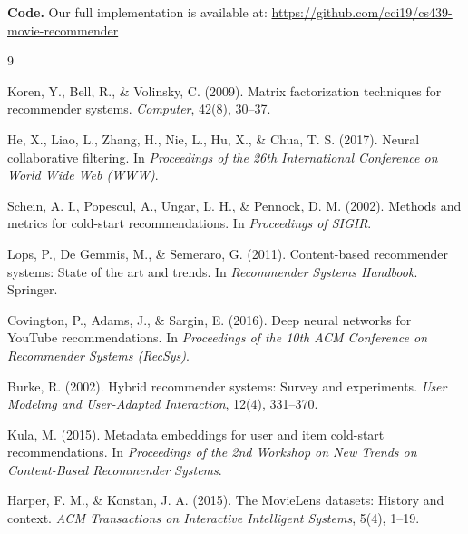 \documentclass{article}
\begin{document}
\textbf{Code.} Our full implementation is available at: \url{https://github.com/cci19/cs439-movie-recommender}


\begin{thebibliography}{9}

Koren, Y., Bell, R., \& Volinsky, C. (2009). Matrix factorization techniques for recommender systems. \textit{Computer}, 42(8), 30--37.

He, X., Liao, L., Zhang, H., Nie, L., Hu, X., \& Chua, T. S. (2017). Neural collaborative filtering. In \textit{Proceedings of the 26th International Conference on World Wide Web (WWW)}.

Schein, A. I., Popescul, A., Ungar, L. H., \& Pennock, D. M. (2002). Methods and metrics for cold-start recommendations. In \textit{Proceedings of SIGIR}.

Lops, P., De Gemmis, M., \& Semeraro, G. (2011). Content-based recommender systems: State of the art and trends. In \textit{Recommender Systems Handbook}. Springer.

Covington, P., Adams, J., \& Sargin, E. (2016). Deep neural networks for YouTube recommendations. In \textit{Proceedings of the 10th ACM Conference on Recommender Systems (RecSys)}.

Burke, R. (2002). Hybrid recommender systems: Survey and experiments. \textit{User Modeling and User-Adapted Interaction}, 12(4), 331--370.

Kula, M. (2015). Metadata embeddings for user and item cold-start recommendations. In \textit{Proceedings of the 2nd Workshop on New Trends on Content-Based Recommender Systems}.

Harper, F. M., \& Konstan, J. A. (2015). The MovieLens datasets: History and context. \textit{ACM Transactions on Interactive Intelligent Systems}, 5(4), 1--19.

\end{thebibliography}
\end{document}
